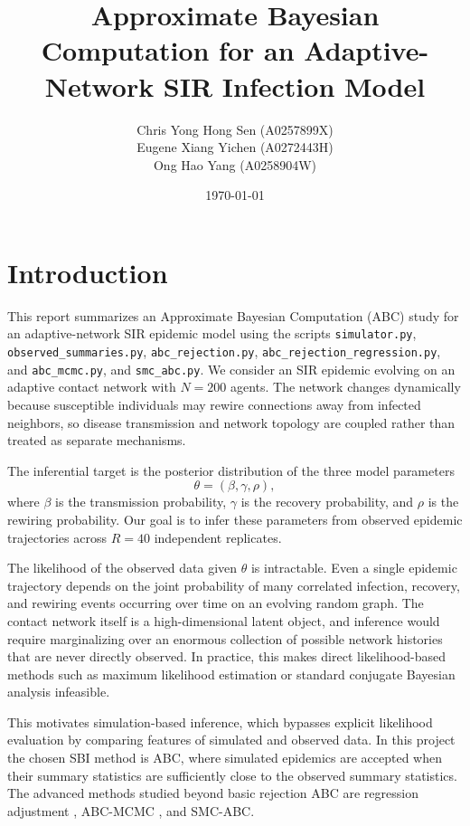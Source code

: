 \documentclass[11pt]{article}
\title{Approximate Bayesian Computation for an Adaptive-Network SIR Infection Model}
\author{
Chris Yong Hong Sen (A0257899X) \\
Eugene Xiang Yichen (A0272443H) \\
Ong Hao Yang (A0258904W)
}
\date{\today}
\begin{document}
\maketitle
\tableofcontents

\section{Introduction}

This report summarizes an Approximate Bayesian Computation (ABC) study for an adaptive-network SIR epidemic model using the scripts
\texttt{simulator.py},
\texttt{observed\_summaries.py},
\texttt{abc\_rejection.py},
\texttt{abc\_rejection\_regression.py}, and
\texttt{abc\_mcmc.py}, and
\texttt{smc\_abc.py}.
We consider an SIR epidemic evolving on an adaptive contact network with $N = 200$ agents. The network changes dynamically because susceptible individuals may rewire connections away from infected neighbors, so disease transmission and network topology are coupled rather than treated as separate mechanisms.

The inferential target is the posterior distribution of the three model parameters
\[
\theta = (\beta,\gamma,\rho),
\]
where $\beta$ is the transmission probability, $\gamma$ is the recovery probability, and $\rho$ is the rewiring probability. Our goal is to infer these parameters from observed epidemic trajectories across $R = 40$ independent replicates.

The likelihood of the observed data given $\theta$ is intractable. Even a single epidemic trajectory depends on the joint probability of many correlated infection, recovery, and rewiring events occurring over time on an evolving random graph. The contact network itself is a high-dimensional latent object, and inference would require marginalizing over an enormous collection of possible network histories that are never directly observed. In practice, this makes direct likelihood-based methods such as maximum likelihood estimation or standard conjugate Bayesian analysis infeasible.

This motivates simulation-based inference, which bypasses explicit likelihood evaluation by comparing features of simulated and observed data. In this project the chosen SBI method is ABC, where simulated epidemics are accepted when their summary statistics are sufficiently close to the observed summary statistics. The advanced methods studied beyond basic rejection ABC are regression adjustment \citep{beaumont2002}, ABC-MCMC \citep{marjoram2003}, and SMC-ABC.
\end{document}
